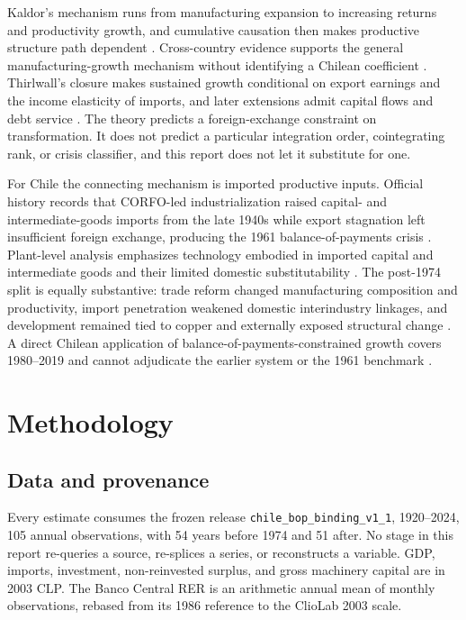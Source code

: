 \documentclass[11pt]{article}
\begin{document}
Kaldor's mechanism runs from manufacturing expansion to increasing returns and productivity growth, and cumulative causation then makes productive structure path dependent \citep{kaldor1967,kaldor1970}. Cross-country evidence supports the general manufacturing-growth mechanism without identifying a Chilean coefficient \citep{marconi2016}. Thirlwall's closure makes sustained growth conditional on export earnings and the income elasticity of imports, and later extensions admit capital flows and debt service \citep{thirlwall1979,thirlwall1982,morenobrid2003}. The theory predicts a foreign-exchange constraint on transformation. It does not predict a particular integration order, cointegrating rank, or crisis classifier, and this report does not let it substitute for one.

For Chile the connecting mechanism is imported productive inputs. Official history records that CORFO-led industrialization raised capital- and intermediate-goods imports from the late 1940s while export stagnation left insufficient foreign exchange, producing the 1961 balance-of-payments crisis \citep{bcch2025}. Plant-level analysis emphasizes technology embodied in imported capital and intermediate goods and their limited domestic substitutability \citep{alvarez2003}. The post-1974 split is equally substantive: trade reform changed manufacturing composition and productivity, import penetration weakened domestic interindustry linkages, and development remained tied to copper and externally exposed structural change \citep{ffd1983a,ffd1983b,ffd2002,albala2006,palma2019,solimano2024}. A direct Chilean application of balance-of-payments-constrained growth covers 1980--2019 and cannot adjudicate the earlier system or the 1961 benchmark \citep{yunga2022}.

\FloatBarrier
\section{Methodology}

\subsection{Data and provenance}

Every estimate consumes the frozen release \texttt{chile\_bop\_binding\_v1\_1}, 1920--2024, 105 annual observations, with 54 years before 1974 and 51 after. No stage in this report re-queries a source, re-splices a series, or reconstructs a variable. GDP, imports, investment, non-reinvested surplus, and gross machinery capital are in 2003 CLP. The Banco Central RER is an arithmetic annual mean of monthly observations, rebased from its 1986 reference to the ClioLab 2003 scale.
\end{document}
